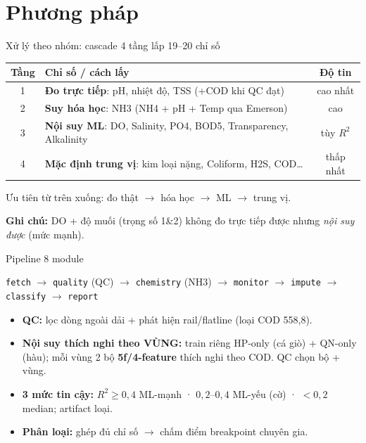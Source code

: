 \documentclass[aspectratio=169]{beamer}
\begin{document}
\section{Phương pháp}
\begin{frame}{Xử lý theo nhóm: cascade 4 tầng lấp 19--20 chỉ số}
  \begin{center}\small
  \begin{tabular}{clc}
    \toprule
    \textbf{Tầng} & \textbf{Chỉ số / cách lấy} & \textbf{Độ tin} \\
    \midrule
    1 & \textbf{Đo trực tiếp}: pH, nhiệt độ, TSS (+COD khi QC đạt) & cao nhất \\
    2 & \textbf{Suy hóa học}: NH3 (NH4 + pH + Temp qua Emerson) & cao \\
    3 & \textbf{Nội suy ML}: DO, Salinity, PO4, BOD5, Transparency, Alkalinity & tùy $R^2$ \\
    4 & \textbf{Mặc định trung vị}: kim loại nặng, Coliform, H2S, COD\dots & thấp nhất \\
    \bottomrule
  \end{tabular}
  \end{center}
  \vspace{4pt}\footnotesize
  Ưu tiên từ trên xuống: đo thật $\to$ hóa học $\to$ ML $\to$ trung vị.
  \par\vspace{2pt}\textbf{Ghi chú:} DO + độ muối (trọng số 1\&2) không đo trực tiếp được nhưng \emph{nội suy được} (mức mạnh).
\end{frame}

\begin{frame}{Pipeline 8 module}
  \begin{center}\small
  \texttt{fetch} $\to$ \texttt{quality} (QC) $\to$ \texttt{chemistry} (NH3) $\to$
  \texttt{monitor} $\to$ \texttt{impute} $\to$ \texttt{classify} $\to$ \texttt{report}
  \end{center}
  \begin{itemize}
    \item \textbf{QC:} lọc dòng ngoài dải + phát hiện rail/flatline (loại COD 558{,}8).
    \item \textbf{Nội suy thích nghi theo VÙNG:} train riêng HP-only (cá giò) + QN-only (hàu);
      mỗi vùng 2 bộ \textbf{5f/4-feature} thích nghi theo COD. QC chọn bộ + vùng.
    \item \textbf{3 mức tin cậy:} $R^2\ge0{,}4$ ML-mạnh · $0{,}2$--$0{,}4$ ML-yếu (cờ) · $<0{,}2$ median; artifact loại.
    \item \textbf{Phân loại:} ghép đủ chỉ số $\to$ chấm điểm breakpoint chuyên gia.
  \end{itemize}
\end{frame}
\end{document}
